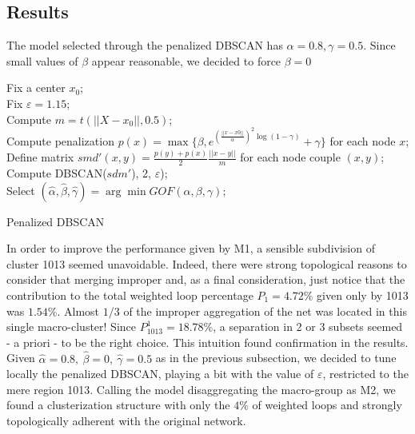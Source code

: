 \documentclass[11pt,twoside]{report}
\begin{document}
\subsection{Results}
The model selected through the penalized DBSCAN has $ \alpha=0.8, \gamma=0.5 $. Since small values of $ \beta $ appear reasonable, we decided to force $ \beta=0 $ 

\begin{algorithm}[H]
	\SetAlgoLined
	Fix a center $ x_0 $;\\
	Fix $ \varepsilon=1.15 $;\\
	Compute $ m=t(||X -x_0||,0.5) $;\\
	{
		{
			{
				 Compute penalization $ p(x) = \max\{\beta, e^{(\frac{||x-x0||}{\alpha})^2\log{(1-\gamma)}}+\gamma\} $ for each node $ x $;\\
				 Define matrix $ smd'(x,y) = \frac{p(y)+p(x)}{2}\frac{||x-y||}{m} $ for each node couple $ (x,y) $;\\
				 Compute DBSCAN($ sdm' $), 2, $\varepsilon$);\\
			}
		}
	}
	Select $ (\hat{\alpha},\hat{\beta},\hat{\gamma})=\arg\min GOF(\alpha,\beta,\gamma) $;\\
	\caption{Penalized DBSCAN}
\end{algorithm}

In order to improve the performance given by M1, a sensible subdivision of cluster 1013 seemed unavoidable. Indeed, there were strong topological reasons to consider that merging improper and, as a final consideration, just notice that the contribution to the total weighted loop percentage $ P_1=4.72\% $ given only by 1013 was $ 1.54\% $. Almost $ 1/3 $ of the improper aggregation of the net was located in this single macro-cluster! Since $ P_{1013}^1=18.78\% $, a separation in 2 or 3 subsets seemed - a priori - to be the right choice. This intuition found confirmation in the results. Given $ \hat{\alpha}=0.8,\ \hat{\beta}=0,\ \hat{\gamma}=0.5 $ as in the previous subsection, we decided to tune locally the penalized DBSCAN, playing a bit with the value of $ \varepsilon $, restricted to the mere region 1013. Calling the model disaggregating the macro-group as M2, we found a clusterization structure with only the $ 4\% $ of weighted loops and strongly topologically adherent with the original network. 
\end{document}
